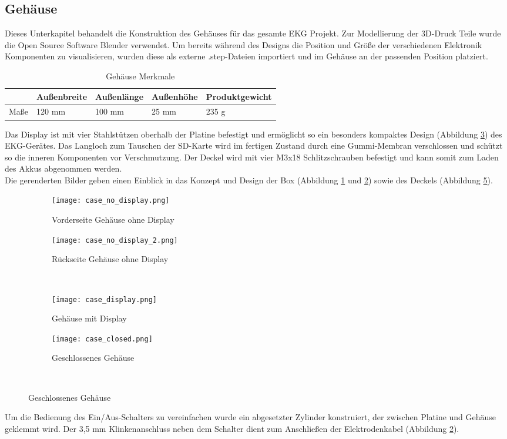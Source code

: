 \subsection{Gehäuse}
Dieses Unterkapitel behandelt die Konstruktion des Gehäuses für das gesamte EKG Projekt. Zur Modellierung der 3D-Druck Teile wurde die Open Source Software Blender verwendet. Um bereits während des Designs die Position und Größe der verschiedenen Elektronik Komponenten zu visualisieren, wurden diese als externe .step-Dateien importiert und im Gehäuse an der passenden Position platziert.

\begin{table}[h]
\centering
\caption{Gehäuse Merkmale}
\begin{tabular}[h]{l|l|l|l|l}
		& Außenbreite & Außenlänge & Außenhöhe & Produktgewicht \\
\hline
Maße 	& 120 mm & 100 mm & 25 mm & 235 g \\
\end{tabular}
\end{table}

Das Display ist mit vier Stahlstützen oberhalb der Platine befestigt und ermöglicht so ein besonders kompaktes Design (Abbildung \ref{case_display}) des EKG-Gerätes. Das Langloch zum Tauschen der SD-Karte wird im fertigen Zustand durch eine Gummi-Membran verschlossen und schützt so die inneren Komponenten vor Verschmutzung. Der Deckel wird mit vier M3x18 Schlitzschrauben befestigt und kann somit zum Laden des Akkus abgenommen werden. \\
Die gerenderten Bilder geben einen Einblick in das Konzept und Design der Box (Abbildung \ref{case_no_display1} und \ref{case_no_display2}) sowie des Deckels (Abbildung \ref{case_closed}).

\begin{figure}
	\begin{subfigure}[t]{0.49\textwidth}
		\texttt{[image: case\_no\_display.png]}
		\caption{Vorderseite Gehäuse ohne Display}
		\label{case_no_display1}
	\end{subfigure}\hfill%
	\begin{subfigure}[t]{0.49\textwidth}
		\texttt{[image: case\_no\_display\_2.png]}
		\caption{Rückseite Gehäuse ohne Display}
		\label{case_no_display2}
	\end{subfigure}\\[5pt]%
	
	\begin{subfigure}[t]{0.49\textwidth}
		\texttt{[image: case\_display.png]}
		\caption{Gehäuse mit Display}
		\label{case_display}
	\end{subfigure}\hfill%
	\begin{subfigure}[t]{0.49\textwidth}
		\texttt{[image: case\_closed.png]}
		\caption{Geschlossenes Gehäuse}
		\label{case_closed} 
	\end{subfigure}\\[5pt]%

\end{figure}

Um die Bedienung des Ein/Aus-Schalters zu vereinfachen wurde ein abgesetzter Zylinder konstruiert, der zwischen Platine und Gehäuse geklemmt wird. Der 3,5 mm Klinkenanschluss neben dem Schalter dient zum Anschließen der Elektrodenkabel (Abbildung \ref{case_no_display2}).